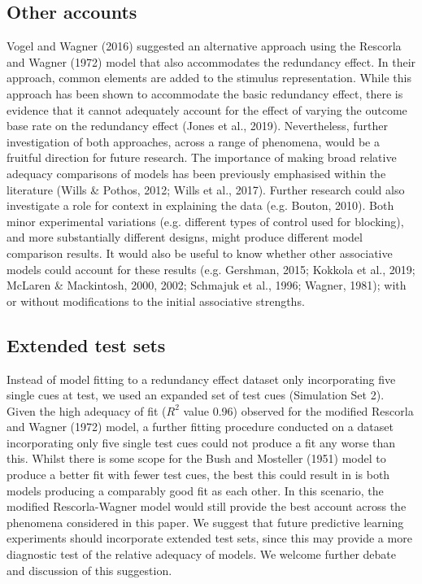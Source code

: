 \documentclass[twocolumn]{article}
\begin{document}
\subsection{Other accounts}

Vogel and Wagner (2016) suggested an
alternative approach using the Rescorla and Wagner (1972) model that
also accommodates the redundancy effect. In their approach, common
elements are added to the stimulus representation. While this approach
has been shown to accommodate the basic redundancy effect, there is
evidence that it cannot adequately account for the effect of varying the
outcome base rate on the redundancy effect (Jones et al., 2019).
Nevertheless, further investigation of both approaches, across a range
of phenomena, would be a fruitful direction for future research. The
importance of making broad relative adequacy comparisons of models has
been previously emphasised within the literature (Wills \& Pothos, 2012;
Wills et al., 2017). Further research could also investigate a role for
context in explaining the data (e.g. Bouton, 2010). Both minor
experimental variations (e.g. different types of control used for
blocking), and more substantially different designs, might produce
different model comparison results. It would also be useful to know
whether other associative models could account for these results (e.g.
Gershman, 2015; Kokkola et al., 2019; McLaren \& Mackintosh, 2000,
2002; Schmajuk et al., 1996; Wagner, 1981); with or without
modifications to the initial associative strengths.

\subsection{Extended test sets}

Instead of model fitting to a redundancy
effect dataset only incorporating five single cues at test, we used an
expanded set of test cues (Simulation Set 2). Given the high adequacy of
fit ($R^2$ value 0.96) observed for the modified Rescorla
and Wagner (1972) model, a further fitting procedure conducted on a
dataset incorporating only five single test cues could not produce a fit
any worse than this. Whilst there is some scope for the Bush and
Mosteller (1951) model to produce a better fit with fewer test cues, the
best this could result in is both models producing a comparably good fit
as each other. In this scenario, the modified Rescorla-Wagner model
would still provide the best account across the phenomena considered in
this paper. We suggest that future predictive learning experiments
should incorporate extended test sets, since this may provide a more
diagnostic test of the relative adequacy of models. We welcome further
debate and discussion of this suggestion.
\end{document}
